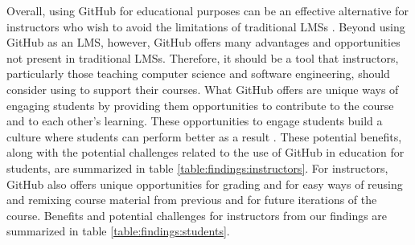 Overall, using GitHub for educational purposes can be an effective alternative for instructors who wish to avoid the limitations of traditional LMSs \cite{garcia2011opening}. Beyond using GitHub as an LMS, however, GitHub offers many advantages and opportunities not present in traditional LMSs. Therefore, it should be a tool that instructors, particularly those teaching computer science and software engineering, should consider using to support their courses. What GitHub offers are unique ways of engaging students by providing them opportunities to contribute to the course and to each other's learning. These opportunities to engage students build a culture where students can perform better as a result \cite{kuh2001assessing}. These potential benefits, along with the potential challenges related to the use of GitHub in education for students, are summarized in table \ref{table:findings:instructors}. For instructors, GitHub also offers unique opportunities for grading and for easy ways of reusing and remixing course material from previous and for future iterations of the course. Benefits and potential challenges for instructors from our findings are summarized in table \ref{table:findings:students}.

